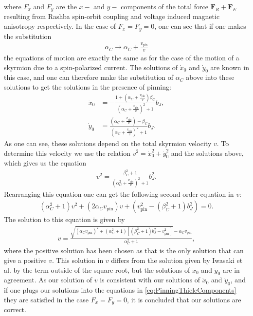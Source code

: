 \documentclass[12pt, a4paper, twoside, openright]{report}
\numberwithin{equation}{chapter}
\numberwithin{figure}{chapter}
\numberwithin{table}{chapter}
\begin{document}
where $F_x$ and $F_y$ are the $x-$ and $y-$ components of the total force $\mathbold{F}_R + \mathbold{F}_E$ resulting from Rashba spin-orbit coupling and voltage induced magnetic anisotropy respectively. In the case of $F_x = F_y = 0$, one can see that if one makes the substitution
\begin{align}
\alpha_C \rightarrow \alpha_C+\frac{v_{\textrm{pin}}}{v}
\end{align}
the equations of motion are exactly the same as for the case of the motion of a skyrmion due to a spin-polarized current. The solutions of $\dot{x}_0$ and $\dot{y}_0$ are known in this case, and one can therefore make the substitution of $\alpha_C$ above into these solutions to get the solutions in the presence of pinning:
\begin{subequations}
\begin{align}
\dot{x}_0 &= -\frac{1+(\alpha_C+\frac{v_{\textrm{pin}}}{v})\beta_C}{(\alpha_C+\frac{v_{\textrm{pin}}}{v})^2+1}b_J, \\
\dot{y}_0 &= \frac{(\alpha_C+\frac{v_{\textrm{pin}}}{v}) - \beta_C}{(\alpha_C+\frac{v_{\textrm{pin}}}{v})^2+1}b_J.
\end{align}
\end{subequations}
As one can see, these solutions depend on the total skyrmion velocity $v$. To determine this velocity we use the relation $v^2 = \dot{x}_0^2+\dot{y}_0^2$ and the solutions above, which gives us the equation
\begin{align}
v^2 = \frac{\beta_C^2+1}{(\alpha_C^2+\frac{v_{\textrm{pin}}}{v})^2+1}b_J^2.
\end{align}
Rearranging this equation one can get the following second order equation in $v$:
\begin{align}
(\alpha_C^2+1)v^2+(2\alpha_Cv_{\textrm{pin}})v + (v_{\textrm{pin}}^2-(\beta_C^2+1)b_J^2) = 0.
\end{align}
The solution to this equation is given by
\begin{align}
v = \frac{\sqrt{(\alpha_Cv_{\textrm{pin}})^2+(\alpha_C^2+1)\left[(\beta_C^2+1)b_J^2-v_{\textrm{pin}}^2\right]}-\alpha_Cv_{\textrm{pin}}}{\alpha_C^2+1},
\end{align}
where the positive solution has been chosen as that is the only solution that can give a positive $v$. This solution in $v$ differs from the solution given by Iwasaki et al. \cite{Iwasaki2013} by the term outside of the square root, but the solutions of $\dot{x}_0$ and $\dot{y}_0$ are in agreement. As our solution of $v$ is consistent with our solutions of $\dot{x}_0$ and $\dot{y}_0$, and if one plugs our solutions into the equations in \eqref{eq:PinningThieleComponents} they are satisfied in the case $F_x = F_y = 0$, it is concluded that our solutions are correct. 
\end{document}

